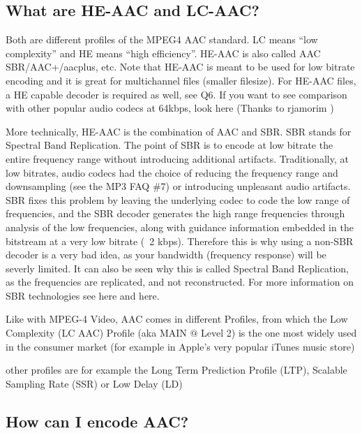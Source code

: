 ﻿\documentclass[12pt]{article}
\begin{document}
\subsection{What are HE-AAC and LC-AAC?}

Both are different profiles of the MPEG4 AAC standard. LC means ``low complexity'' and HE means
``high efficiency''. HE-AAC is also called AAC SBR/AAC+/aacplus, etc. Note that HE-AAC is meant to
be used for low bitrate encoding and it is great for multichannel files (smaller filesize). For
HE-AAC files, a HE capable decoder is required as well, see Q6. If you want to see comparison with
other popular audio codecs at 64kbps, look here (Thanks to rjamorim )

More technically, HE-AAC is the combination of AAC and SBR. SBR stands for Spectral Band
Replication. The point of SBR is to encode at low bitrate the entire frequency range without
introducing additional artifacts. Traditionally, at low bitrates, audio codecs had the choice of
reducing the frequency range and downsampling (see the MP3 FAQ \#7) or introducing unpleasant audio
artifacts. SBR fixes this problem by leaving the underlying codec to code the low range of
frequencies, and the SBR decoder generates the high range frequencies through analysis of the low
frequencies, along with guidance information embedded in the bitstream at a very low bitrate (~2
kbps). Therefore this is why using a non-SBR decoder is a very bad idea, as your bandwidth
(frequency response) will be severly limited. It can also be seen why this is called Spectral Band
Replication, as the frequencies are replicated, and not reconstructed. For more information on SBR
technologies see here and here.

Like with MPEG-4 Video, AAC comes in different Profiles, from which the Low Complexity (LC AAC)
Profile (aka MAIN $@$ Level 2) is the one most widely used in the consumer market (for example in
Apple's very popular iTunes music store)

other profiles are for example the Long Term Prediction Profile (LTP), Scalable Sampling Rate (SSR)
or Low Delay (LD)

\subsection{How can I encode AAC?}
\end{document}
